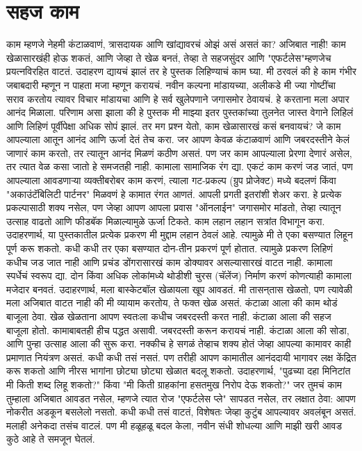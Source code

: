  \chapter{सहज काम}
काम म्हणजे नेहमी कंटाळवाणं, त्रासदायक आणि खांद्यावरचं ओझं असं असतं का? अजिबात नाही! काम खेळासारखंही होऊ शकतं, आणि जेव्हा ते खेळ बनतं, तेव्हा ते सहजसुंदर आणि "एफर्टलेस"म्हणजेच प्रयत्नविरहित वाटतं.
उदाहरण द्यायचं झालं तर हे पुस्तक लिहिण्याचं काम घ्या. मी ठरवलं की हे काम गंभीर जबाबदारी म्हणून न पाहता मजा म्हणून करायचं. नवीन कल्पना मांडायच्या, अलीकडे मी ज्या गोष्टींचा सराव करतोय त्यावर विचार मांडायचा आणि हे सर्व खुलेपणाने जगासमोर ठेवायचं. हे करताना मला अपार आनंद मिळाला.
परिणाम असा झाला की हे पुस्तक मी माझ्या इतर पुस्तकांच्या तुलनेत जास्त वेगाने लिहिलं आणि लिहिणं पूर्वीपेक्षा अधिक सोपं झालं.
तर मग प्रश्न येतो,  काम खेळासारखं कसं बनवायचं?
जे काम आपल्याला आतून आनंद आणि ऊर्जा देतं तेच करा. जर आपण केवळ कंटाळवाणं आणि जबरदस्तीने केलं जाणारं काम करतो, तर त्यातून आनंद मिळणं कठीण असतं. पण जर काम आपल्याला प्रेरणा देणारं असेल, तर त्यात वेळ कसा जातो हे समजतही नाही.
कामाला सामाजिक रंग द्या. एकटं काम करणं जड जातं, पण आपल्याला आवडणाऱ्या व्यक्तीबरोबर काम करणं, त्याला गट-प्रकल्प (ग्रुप प्रोजेक्ट) मध्ये बदलणं किंवा "अकाउंटॅबिलिटी पार्टनर" मिळवणं हे कामात रंगत आणतं.
आपली प्रगती इतरांशी शेअर करा. हे प्रत्येक प्रकल्पासाठी शक्य नसेल, पण जेव्हा आपण आपला प्रवास "ऑनलाईन" जगासमोर मांडतो, तेव्हा त्यातून उत्साह वाढतो आणि फीडबॅक मिळाल्यामुळे ऊर्जा टिकते.
काम लहान लहान सत्रांत विभागून करा. उदाहरणार्थ, या पुस्तकातील प्रत्येक प्रकरण मी मुद्दाम लहान ठेवलं आहे. त्यामुळे मी ते एका बसण्यात लिहून पूर्ण करू शकतो. कधी कधी तर एका बसण्यात दोन-तीन प्रकरणं पूर्ण होतात. त्यामुळे प्रकरण लिहिणं कधीच जड जात नाही आणि प्रचंड डोंगरासारखं काम डोक्यावर असल्यासारखं वाटत नाही.
कामाला स्पर्धेचं स्वरूप द्या. दोन किंवा अधिक लोकांमध्ये थोडीशी चुरस (चॅलेंज) निर्माण करणं कोणत्याही कामाला मजेदार बनवतं. उदाहरणार्थ, मला बास्केटबॉल खेळायला खूप आवडतं. मी तासन्‌तास खेळतो, पण त्यावेळी मला अजिबात वाटत नाही की मी व्यायाम करतोय, ते फक्त खेळ असतं.
कंटाळा आला की काम थोडं बाजूला ठेवा. खेळ खेळताना आपण स्वतःला कधीच जबरदस्ती करत नाही. कंटाळा आला की सहज बाजूला होतो. कामाबाबतही हीच पद्धत असावी. जबरदस्ती करून करायचं नाही. कंटाळा आला की सोडा, आणि पुन्हा उत्साह आला की सुरू करा.
नक्कीच हे सगळं तेव्हाच शक्य होतं जेव्हा आपल्या कामावर काही प्रमाणात नियंत्रण असतं. कधी कधी तसं नसतं. पण तरीही आपण कामातील आनंददायी भागावर लक्ष केंद्रित करू शकतो आणि नीरस भागांना छोट्या छोट्या खेळात बदलू शकतो. उदाहरणार्थ, "पुढच्या दहा मिनिटांत मी किती शब्द लिहू शकतो?" किंवा "मी किती ग्राहकांना हसतमुख निरोप देऊ शकतो?"
जर तुमचं काम तुम्हाला अजिबात आवडत नसेल, म्हणजे त्यात रोज "एफर्टलेस प्ले" सापडत नसेल, तर लक्षात ठेवा: आपण नोकरीत अडकून बसलेलो नसतो. कधी कधी तसं वाटतं, विशेषतः जेव्हा कुटुंब आपल्यावर अवलंबून असतं. मलाही अनेकदा तसंच वाटलं. पण मी हळूहळू बदल केला, नवीन संधी शोधल्या आणि माझी खरी आवड कुठे आहे ते समजून घेतलं.
